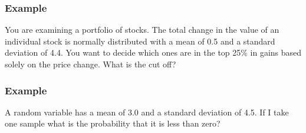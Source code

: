 \begin{frame}
  \frametitle{Example}

  You are examining a portfolio of stocks. The total change in the
  value of an individual stock is normally distributed with a mean of
  0.5 and a standard deviation of 4.4. You want to decide which ones
  are in the top 25\% in gains based solely on the price change. What
  is the cut off?

  \vfill


  \vfill


\end{frame}





\begin{frame}
  \frametitle{Example}

  A random variable has a mean of 3.0 and a standard deviation of
  4.5. If I take one sample what is the probability that it is less
  than zero?

  \vfill


  \vfill

%

\end{frame}

